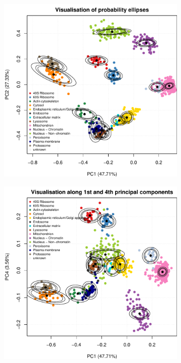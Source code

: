 \documentclass[12pt,english]{article}
\begin{document}
\begin{figure}[ht]
  \begin{subfigure}[t]{0.5\textwidth}
        \centering
\includegraphics{tagm-002}
        \caption{}
\end{subfigure}%
\hfill
\begin{subfigure}[t]{0.5\textwidth}
        \centering
\includegraphics{tagm-003}

\end{subfigure}
\end{figure}
\end{document}
